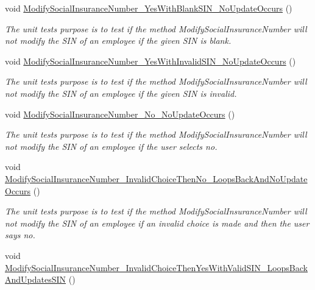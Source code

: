 \begin{DoxyCompactItemize}
void \hyperlink{class_the_company_1_1_tests_1_1_modify_employee_tests_aba342d40f5fc1e5ba6c30e5554b6b809}{Modify\+Social\+Insurance\+Number\+\_\+\+Yes\+With\+Blank\+S\+I\+N\+\_\+\+No\+Update\+Occurs} ()
\begin{DoxyCompactList}\small\item\em The unit test\textquotesingle{}s purpose is to test if the method Modify\+Social\+Insurance\+Number will not modify the S\+I\+N of an employee if the given S\+I\+N is blank. \end{DoxyCompactList}\item 
void \hyperlink{class_the_company_1_1_tests_1_1_modify_employee_tests_a1dcb113ba0ec4d2cc236006a0160abb1}{Modify\+Social\+Insurance\+Number\+\_\+\+Yes\+With\+Invalid\+S\+I\+N\+\_\+\+No\+Update\+Occurs} ()
\begin{DoxyCompactList}\small\item\em The unit test\textquotesingle{}s purpose is to test if the method Modify\+Social\+Insurance\+Number will not modify the S\+I\+N of an employee if the given S\+I\+N is invalid. \end{DoxyCompactList}\item 
void \hyperlink{class_the_company_1_1_tests_1_1_modify_employee_tests_a93028469171425b6d30b333475ef5881}{Modify\+Social\+Insurance\+Number\+\_\+\+No\+\_\+\+No\+Update\+Occurs} ()
\begin{DoxyCompactList}\small\item\em The unit test\textquotesingle{}s purpose is to test if the method Modify\+Social\+Insurance\+Number will not modify the S\+I\+N of an employee if the user selects no. \end{DoxyCompactList}\item 
void \hyperlink{class_the_company_1_1_tests_1_1_modify_employee_tests_a38ed99bc458826b03df1515350bbca8c}{Modify\+Social\+Insurance\+Number\+\_\+\+Invalid\+Choice\+Then\+No\+\_\+\+Loops\+Back\+And\+No\+Update\+Occurs} ()
\begin{DoxyCompactList}\small\item\em The unit test\textquotesingle{}s purpose is to test if the method Modify\+Social\+Insurance\+Number will not modify the S\+I\+N of an employee if an invalid choice is made and then the user says no. \end{DoxyCompactList}\item 
void \hyperlink{class_the_company_1_1_tests_1_1_modify_employee_tests_afc3871c3e014ae940d2defc2e65c4451}{Modify\+Social\+Insurance\+Number\+\_\+\+Invalid\+Choice\+Then\+Yes\+With\+Valid\+S\+I\+N\+\_\+\+Loops\+Back\+And\+Updates\+S\+I\+N} ()

\end{DoxyCompactItemize}
